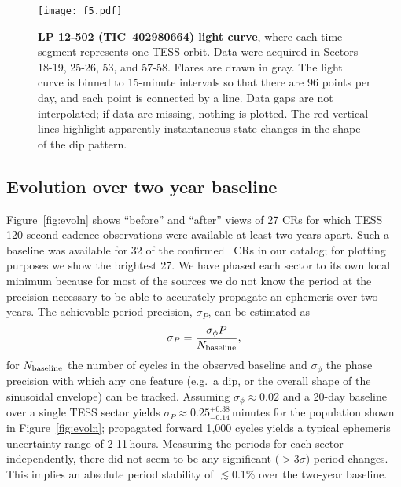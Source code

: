 \documentclass[11pt,twocolumn,tighten]{aastex63}
\begin{document}
\begin{figure*}[!tp]
	\begin{center}
		\centering
		\texttt{[image: f5.pdf]}
		\vspace{-0.3cm}
		\caption{
      {\bf LP 12-502 (TIC~402980664) light curve}, where each time
      segment represents one TESS orbit.  Data were acquired in Sectors
      18-19, 25-26, 53, and 57-58.  Flares are drawn in gray.  The
      light curve is binned to 15-minute intervals so that there are
      96 points per day, and each point is connected by a line.  Data
      gaps are not interpolated; if data are missing, nothing
      is plotted.  The red vertical lines highlight apparently
      instantaneous state changes in the shape of the dip pattern.  
		}
		\label{fig:lplc}
	\end{center}
\end{figure*}


\subsection{Evolution over two year baseline}

Figure~\ref{fig:evoln} shows ``before'' and ``after'' views of 27 CRs
for which TESS 120-second cadence observations were available at least
two years apart.  Such a baseline was available for 32 of the
confirmed \ngoods\ CRs in our catalog; for plotting purposes we show
the brightest 27.  We have phased each sector to its own local minimum
because for most of the sources we do not know the period at the
precision necessary to be able to accurately propagate an ephemeris
over two years.  The achievable period precision, $\sigma_P$, can be
estimated as
\begin{equation}
  \sigma_{P} = \frac { \sigma_{\phi} P } { N_{\rm baseline} },
  \label{eq:periodprecision}
\end{equation}
for $N_{\rm baseline}$ the number of cycles in the observed baseline
and $\sigma_{\phi}$ the phase precision with which any one feature
(e.g.~a dip, or the overall shape of the sinusoidal envelope) can be
tracked.  Assuming $\sigma_\phi$$\approx$$0.02$ and a 20-day baseline
over a single TESS sector yields
$\sigma_{P}$$\approx$$0.25^{+0.38}_{-0.14}$\,minutes for the
population shown in Figure~\ref{fig:evoln}; propagated forward 1{,}000
cycles yields a typical ephemeris uncertainty range of 2-11\,hours.
Measuring the periods for each sector independently, there did not
seem to be any significant ($>$3$\sigma$) period changes.  This
implies an absolute period stability of $\lesssim$0.1\% over the
two-year baseline.
\end{document}
